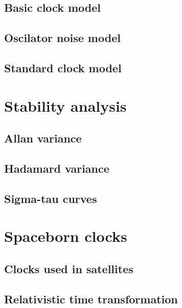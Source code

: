 \subsection{Basic clock model}

\subsection{Oscilator noise model}

\subsection{Standard clock model}


\section{Stability analysis}

\subsection{Allan variance}

\subsection{Hadamard variance}

\subsection{Sigma-tau curves}



\section{Spaceborn clocks}

\subsection{Clocks used in satellites}

\subsection{Relativistic time transformation}

